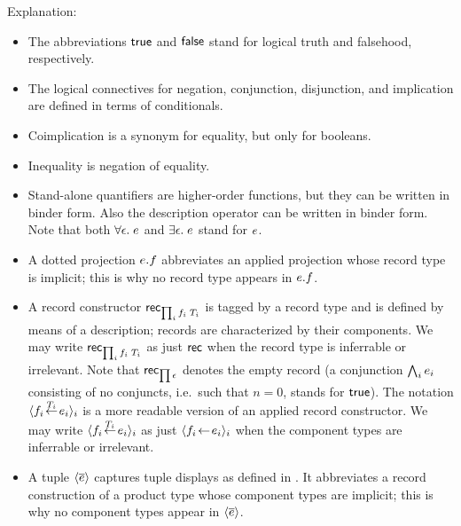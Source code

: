 Explanation:
\begin{itemize}
\item
The abbreviations $\mathsf{true}$ and $\mathsf{false}$ stand for logical truth and falsehood,
respectively.
\item
The logical connectives for negation, conjunction, disjunction, and
implication are defined in terms of conditionals.
\item
Coimplication is a synonym for equality, but only for booleans.
\item
Inequality is negation of equality.
\item
Stand-alone quantifiers are higher-order functions, but they can be written in
binder form. Also the description operator can be written in binder form. Note
that both $\forall\epsilon.\;e$ and $\exists\epsilon.\;e$ stand for $e$.
\item
A dotted projection $e.f$ abbreviates an applied projection whose record
type is implicit; this is why no record type appears in $e.f$.
\item
A record constructor $\mathsf{rec}_{\prod_{i}f_i\;T_i}$ is tagged by a record type and is defined by
means of a description; records are characterized by their components. We may
write $\mathsf{rec}_{\prod_{i}f_i\;T_i}$ as just $\mathsf{rec}$ when the record type is inferrable or
irrelevant. Note that $\mathsf{rec}_{\prod\epsilon}$ denotes the empty record (a
conjunction $\bigwedge_{i}e_i$ consisting of no conjuncts, i.e.\ such that
$n=0$, stands for $\mathsf{true}$).  The notation $\langle f_i\!\stackrel{T_i}{\gets}\!e_i\rangle_{i}$ is a more readable version
of an applied record constructor. We may write $\langle f_i\!\stackrel{T_i}{\gets}\!e_i\rangle_{i}$ as just $\langle f_i\!\gets\!e_i\rangle_{i}$ when
the component types are inferrable or irrelevant.
\item
A tuple $\langle\overline{e}\rangle$ captures tuple displays as defined in \cite{lm}. It
abbreviates a record construction of a product type whose component types are
implicit; this is why no component types appear in $\langle\overline{e}\rangle$.
\end{itemize}

